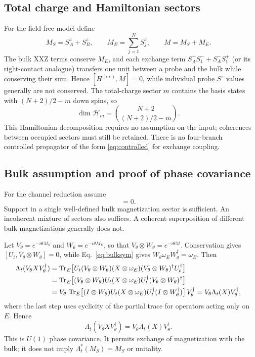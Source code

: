 \documentclass[11pt,a4paper]{article}
\newcommand{\Tr}{\operatorname{Tr}}
\newcommand{\HH}{\mathcal H}
\newcommand{\ex}{\mathrm{ex}}
\begin{document}
\subsection{Total charge and Hamiltonian sectors}

For the field-free model define
\begin{equation}
 M_S=S_A^z+S_B^z,\qquad M_E=\sum_{j=1}^N S_j^z,
 \qquad M=M_S+M_E.
\end{equation}
The bulk XXZ terms conserve $M_E$, and each exchange term
$S_A^+S_1^-+S_A^-S_1^+$ (or its right-contact analogue) transfers one unit
between a probe and the bulk while conserving their sum. Hence
$[H^{(\ex)},M]=0$, while individual probe $S^z$ values generally are not
conserved. The total-charge sector $m$ contains the basis states with
$(N+2)/2-m$ down spins, so
\begin{equation}
 \dim\HH_m=\binom{N+2}{(N+2)/2-m}.
\end{equation}
This Hamiltonian decomposition requires no assumption on the input;
coherences between occupied sectors must still be retained.
There is no four-branch controlled propagator of the form
\eqref{eq:controlled} for exchange coupling.

\subsection{Bulk assumption and proof of phase covariance}

For the channel reduction assume
\begin{equation}
 [\omega_E,M_E]=0.
 \label{eq:bulksym}
\end{equation}
Support in a single well-defined bulk magnetization sector is sufficient.
An incoherent mixture of sectors also suffices. A coherent superposition
of different bulk magnetizations generally does not.

Let $V_\theta=e^{-i\theta M_S}$ and $W_\theta=e^{-i\theta M_E}$, so that
$V_\theta\otimes W_\theta=e^{-i\theta M}$. Conservation gives
$[U_t,V_\theta\otimes W_\theta]=0$, while Eq.~\eqref{eq:bulksym} gives
$W_\theta\omega_EW_\theta^\dagger=\omega_E$. Then
\begin{align}
 \Lambda_t(V_\theta XV_\theta^\dagger)
 &=\Tr_E\bigl[U_t(V_\theta\otimes W_\theta)(X\otimes\omega_E)
 (V_\theta\otimes W_\theta)^\dagger U_t^\dagger\bigr]\notag\\
 &=\Tr_E\bigl[(V_\theta\otimes W_\theta)U_t(X\otimes\omega_E)
 U_t^\dagger(V_\theta\otimes W_\theta)^\dagger\bigr]\notag\\
 &=V_\theta\,\Tr_E\bigl[(I\otimes W_\theta)U_t(X\otimes\omega_E)U_t^\dagger
 (I\otimes W_\theta^\dagger)\bigr]\,V_\theta^\dagger
 =V_\theta\Lambda_t(X)V_\theta^\dagger,
\end{align}
where the last step uses cyclicity of the partial trace for operators
acting only on $E$. Hence
\begin{equation}
 \boxed{\Lambda_t(V_\theta XV_\theta^\dagger)
       =V_\theta\Lambda_t(X)V_\theta^\dagger.}
 \label{eq:covariance}
\end{equation}
This is $U(1)$ phase covariance. It permits exchange of magnetization
with the bulk; it does not imply $\Lambda_t^*(M_S)=M_S$ or unitality.
\end{document}
